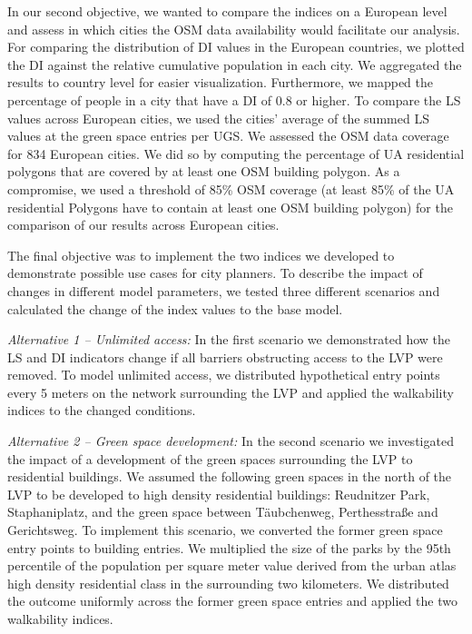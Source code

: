 \documentclass[10pt]{article}
\begin{document}
In our second objective, we wanted to compare the indices on a European level and assess in which cities the OSM data availability would facilitate our analysis.
For comparing the distribution of DI values in the European countries, we plotted the DI against the relative cumulative population in each city.
We aggregated the results to country level for easier visualization.
Furthermore, we mapped the percentage of people in a city that have a DI of 0.8 or higher.
To compare the LS values across European cities, we used the cities’ average of the summed LS values at the green space entries per UGS. 
We assessed the OSM data coverage for 834 European cities.
We did so by computing the percentage of UA residential polygons that are covered by at least one OSM building polygon.
As a compromise, we used a threshold of 85\% OSM coverage (at least 85\% of the UA residential Polygons have to contain at least one OSM building polygon) for the comparison of our results across European cities.

The final objective was to implement the two indices we developed to demonstrate possible use cases for city planners.
To describe the impact of changes in different model parameters, we tested three different scenarios and calculated the change of the index values to the base model.

\textit{Alternative 1 – Unlimited access:} In the first scenario we demonstrated how the LS and DI indicators change if all barriers obstructing access to the LVP were removed.
To model unlimited access, we distributed hypothetical entry points every 5 meters on the network surrounding the LVP and applied the walkability indices to the changed conditions.

\textit{Alternative 2 – Green space development:} In the second scenario we investigated the impact of a development of the green spaces surrounding the LVP to residential buildings.
We assumed the following green spaces in the north of the LVP to be developed to high density residential buildings: Reudnitzer Park, Staphaniplatz, and the green space between Täubchenweg, Perthesstraße and Gerichtsweg.
To implement this scenario, we converted the former green space entry points to building entries.
We multiplied the size of the parks by the 95th percentile of the population per square meter value derived from the urban atlas high density residential class in the surrounding two kilometers.
We distributed the outcome uniformly across the former green space entries and applied the two walkability indices.
\end{document}
